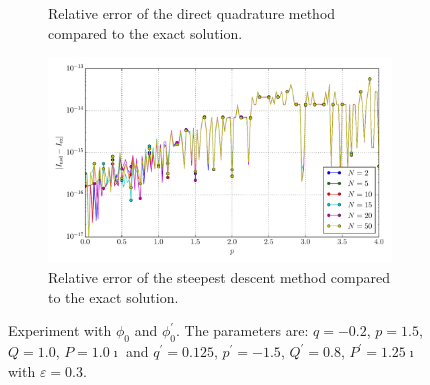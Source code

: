 \documentclass[a4paper,10pt]{article}
\begin{document}
\begin{figure}[ht!]
\begin{subfigure}[t]{0.5\linewidth}
    \caption{Relative error of the direct quadrature method compared to the exact solution.}
    \label{fig:tp_1d_conv_p_0_0_err_qr}
  \end{subfigure}
  \begin{subfigure}[t]{0.5\linewidth}
    \includegraphics[width=\linewidth]{./plots/tp_1d_conv_p_0_0_err_rel_nsd.pdf}
    \caption{Relative error of the steepest descent method compared to the exact solution.}
    \label{fig:tp_1d_conv_p_0_0_err_nsd}
  \end{subfigure}
  \label{fig:tp_1d_conv_p_0_0}
  \caption{Experiment with $\phi_{0}$ and $\phi_{0}^{\prime}$.
  The parameters are:
  $q=-0.2$, $p=1.5$, $Q=1.0$, $P=1.0\imath$ and
  $q^\prime=0.125$, $p^\prime=-1.5$, $Q^\prime=0.8$, $P^\prime=1.25\imath$
  with $\varepsilon = 0.3$.}
\end{figure}
\end{document}
